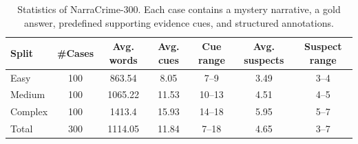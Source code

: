 \begin{table}[t]
\centering
\small
\setlength{\tabcolsep}{4.5pt}
\renewcommand{\arraystretch}{1.08}
\begin{tabular}{lcccccc}
\toprule
Split & \#Cases & Avg. words & Avg. cues & Cue range & Avg. suspects & Suspect range \\
\midrule
Easy & 100 & 863.54 & 8.05 & 7--9 & 3.49 & 3--4 \\
Medium & 100 & 1065.22 & 11.53 & 10--13 & 4.51 & 4--5 \\
Complex & 100 & 1413.4 & 15.93 & 14--18 & 5.95 & 5--7 \\
\midrule
Total & 300 & 1114.05 & 11.84 & 7--18 & 4.65 & 3--7 \\
\bottomrule
\end{tabular}
\caption{Statistics of NarraCrime-300. Each case contains a mystery narrative, a gold answer, predefined supporting evidence cues, and structured annotations.}
\label{tab:narracrime_stats}
\end{table}
